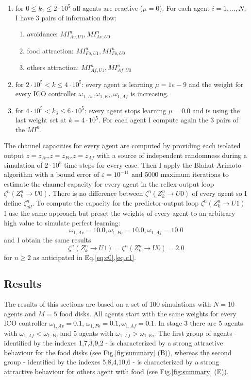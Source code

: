 \begin{enumerate}
 \item for $0\leq k_1\leq 2 \cdot 10^5$ all agents are reactive ($\mu=0$).
	For each agent $i={1,...,N}$, I have 3 pairs of information flow:
	\begin{enumerate}
	\item avoidance: $MI^n_{Av,U1},MI^n_{Av,U0}$
	\item food attraction: $MI^n_{Fo,U1},MI^n_{Fo,U0}$
	\item others attraction: $MI^n_{Af,U1},MI^n_{Af,U0}$
	\end{enumerate}
 \item for $2 \cdot 10^5<k\leq 4 \cdot 10^5$: every agent is learning $\mu=1e-9$
and the weight for every ICO controller $\omega_{1,Av}$,$\omega_{1,Fo},\omega_{1,Af}$ is increasing.
 \item for $4\cdot 10^5< k_3\leq 6 \cdot 10^5$: every agent stops learning $\mu=0.0$
and is using the last weight set at $k=4\cdot 10^5$. For each agent I compute again
the 3 pairs of the $MI^n$.
\end{enumerate}

The channel capacities for every agent are computed by providing each isolated output
$z=z_{Av}$,$z=z_{Fo}$,$z=z_{Af}$ with a source of independent randomness during a simulation
of $2\cdot 10^5$ time steps for every case.
Then I apply the Blahut-Arimoto algorithm \citep{Blahut1,Blahut2} with a bound
 error of $\varepsilon =10^{-11}$ and 5000 maximum iterations to estimate the channel
 capacity for every agent in the reflex-output loop
$\zeta^n(Z^n_k \rightarrow U0)$. There is no difference between $\zeta^n(Z^n_k \rightarrow U0)$
of every agent so I define $\zeta^n_{all}$. To compute the capacity for the predictor-output loop
$\zeta^n(Z^n_k \rightarrow U1)$ I use the same approach but preset the weights of every agent
to an arbitrary high value to simulate perfect learning:
\begin{equation}
\omega_{1,Av}=10.0,\omega_{1,Fo}=10.0,\omega_{1,Af}=10.0
\end{equation}
and I obtain the same results
\begin{equation}
\zeta^n(Z^n_k \rightarrow U1)=\zeta^n(Z^n_k \rightarrow U0)=2.0
\end{equation} for $n \geq 2$ as anticipated in Eq.\ref{eq:c0},\ref{eq.c1}.

\subsection{Results}
The results of this sections are based on a set of 100 simulations with 
$N=10$ agents and $M=5$ food disks.
All agents start with the same weights for every ICO controller $\omega_{1,Av}=0.1$,
$\omega_{1,Fo}=0.1,\omega_{1,Af}=0.1$.
In stage 3 there are 5 agents with $\omega_{1,Af}<\omega_{1,Fo}$ and 5 agents with
$\omega_{1,Af}>\omega_{1,Fo}$. 
The first group of agents - identified by the indexes 1,7,3,9,2 -
is characterized by a strong attractive 
behaviour for the food disks (see Fig.\ref{fig:summary} (B)), whereas the second group 
- identified by the indexes 5,8,4,10,6 - is characterized
by a strong attractive behaviour for others agent with food (see Fig.\ref{fig:summary} (E)). 

